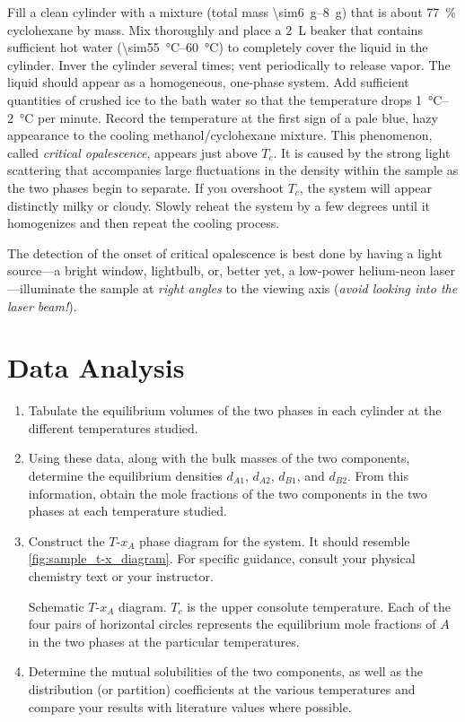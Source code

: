 \begin{enumerate}
	Fill a clean cylinder with a mixture (total mass \qtyrange{\sim6}{8}{\g}) that is about \qty{77}{\percent} cyclohexane by mass. 
	Mix thoroughly and place a \qty{2}{\L} beaker that contains sufficient hot water (\qtyrange{\sim55}{60}{\degreeCelsius}) to completely cover the liquid in the cylinder. 
	Inver the cylinder several times; vent periodically to release vapor. 
	The liquid should appear as a homogeneous, one-phase system. 
	Add sufficient quantities of crushed ice to the bath water so that the temperature drops \qtyrange{1}{2}{\degreeCelsius} per minute. 
	Record the temperature at the first sign of a pale blue, hazy appearance to the cooling methanol/cyclohexane mixture. 
	This phenomenon, called \emph{critical opalescence}, appears just above \(T_c\). 
	It is caused by the strong light scattering that accompanies large fluctuations in the density within the sample as the two phases begin to separate. 
	If you overshoot \(T_c\), the system will appear distinctly milky or cloudy. 
	Slowly reheat the system by a few degrees until it homogenizes and then repeat the cooling process. 
	
	The detection of the onset of critical opalescence is best done by having a light source---a bright window, lightbulb, or, better yet, a low-power helium-neon laser---illuminate the sample at \emph{right angles} to the viewing axis (\emph{avoid looking into the laser beam!}). 
\end{enumerate}

\section{Data Analysis}
\label{sec:data_analysis}

\begin{enumerate}
	\item Tabulate the equilibrium volumes of the two phases in each cylinder at the different temperatures studied. 
	\item Using these data, along with the bulk masses of the two components, determine the equilibrium densities \(d_{A1}\), \(d_{A2}\), \(d_{B1}\), and \(d_{B2}\). 
	From this information, obtain the mole fractions of the two components in the two phases at each temperature studied. 
	\item Construct the \(T\)-\(x_A\) phase diagram for the system. 
	It should resemble \cref{fig:sample_t-x_diagram}. 
	For specific guidance, consult your physical chemistry text or your instructor.
	\begin{marginfigure}
		
		\caption{Schematic \(T\)-\(x_A\) diagram. \(T_c\) is the upper consolute temperature. 
		Each of the four pairs of horizontal circles represents the equilibrium mole fractions of \(A\) in the two phases at the particular temperatures.}
		\label{fig:sample_t-x_diagram}
	\end{marginfigure}
	\item Determine the mutual solubilities of the two components, as well as the distribution (or partition) coefficients at the various temperatures and compare your results with literature values where possible.
\end{enumerate}

